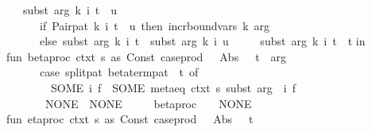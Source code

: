\begin{isabellebody}
\ \ \ \ {\isacharbar}{\kern0pt}\ subst\ arg\ k\ i\ {\isacharparenleft}{\kern0pt}t\ {\isachardollar}{\kern0pt}\ u{\isacharparenright}{\kern0pt}\ {\isacharequal}{\kern0pt}\isanewline
\ \ \ \ \ \ \ \ if\ Pair{\isacharunderscore}{\kern0pt}pat\ k\ i\ {\isacharparenleft}{\kern0pt}t\ {\isachardollar}{\kern0pt}\ u{\isacharparenright}{\kern0pt}\ then\ incr{\isacharunderscore}{\kern0pt}boundvars\ k\ arg\isanewline
\ \ \ \ \ \ \ \ else\ {\isacharparenleft}{\kern0pt}subst\ arg\ k\ i\ t\ {\isachardollar}{\kern0pt}\ subst\ arg\ k\ i\ u{\isacharparenright}{\kern0pt}\isanewline
\ \ \ \ {\isacharbar}{\kern0pt}\ subst\ arg\ k\ i\ t\ {\isacharequal}{\kern0pt}\ t{\isacharsemicolon}{\kern0pt}\isanewline
in\isanewline
\ \ fun\ beta{\isacharunderscore}{\kern0pt}proc\ ctxt\ {\isacharparenleft}{\kern0pt}s\ as\ Const\ {\isacharparenleft}{\kern0pt}\isactrlconstUNDERSCOREname {\isasymopen}case{\isacharunderscore}{\kern0pt}prod{\isasymclose}{\isacharcomma}{\kern0pt}\ {\isacharunderscore}{\kern0pt}{\isacharparenright}{\kern0pt}\ {\isachardollar}{\kern0pt}\ Abs\ {\isacharparenleft}{\kern0pt}{\isacharunderscore}{\kern0pt}{\isacharcomma}{\kern0pt}\ {\isacharunderscore}{\kern0pt}{\isacharcomma}{\kern0pt}\ t{\isacharparenright}{\kern0pt}\ {\isachardollar}{\kern0pt}\ arg{\isacharparenright}{\kern0pt}\ {\isacharequal}{\kern0pt}\isanewline
\ \ \ \ \ \ \ \ {\isacharparenleft}{\kern0pt}case\ split{\isacharunderscore}{\kern0pt}pat\ beta{\isacharunderscore}{\kern0pt}term{\isacharunderscore}{\kern0pt}pat\ {}\ t\ of\isanewline
\ \ \ \ \ \ \ \ \ \ SOME\ {\isacharparenleft}{\kern0pt}i{\isacharcomma}{\kern0pt}\ f{\isacharparenright}{\kern0pt}\ {\isacharequal}{\kern0pt}{\isachargreater}{\kern0pt}\ SOME\ {\isacharparenleft}{\kern0pt}metaeq\ ctxt\ s\ {\isacharparenleft}{\kern0pt}subst\ arg\ {}\ i\ f{\isacharparenright}{\kern0pt}{\isacharparenright}{\kern0pt}\isanewline
\ \ \ \ \ \ \ \ {\isacharbar}{\kern0pt}\ NONE\ {\isacharequal}{\kern0pt}{\isachargreater}{\kern0pt}\ NONE{\isacharparenright}{\kern0pt}\isanewline
\ \ \ \ {\isacharbar}{\kern0pt}\ beta{\isacharunderscore}{\kern0pt}proc\ {\isacharunderscore}{\kern0pt}\ {\isacharunderscore}{\kern0pt}\ {\isacharequal}{\kern0pt}\ NONE{\isacharsemicolon}{\kern0pt}\isanewline
\ \ fun\ eta{\isacharunderscore}{\kern0pt}proc\ ctxt\ {\isacharparenleft}{\kern0pt}s\ as\ Const\ {\isacharparenleft}{\kern0pt}\isactrlconstUNDERSCOREname {\isasymopen}case{\isacharunderscore}{\kern0pt}prod{\isasymclose}{\isacharcomma}{\kern0pt}\ {\isacharunderscore}{\kern0pt}{\isacharparenright}{\kern0pt}\ {\isachardollar}{\kern0pt}\ Abs\ {\isacharparenleft}{\kern0pt}{\isacharunderscore}{\kern0pt}{\isacharcomma}{\kern0pt}\ {\isacharunderscore}{\kern0pt}{\isacharcomma}{\kern0pt}\ t{\isacharparenright}{\kern0pt}{\isacharparenright}{\kern0pt}\ {\isacharequal}{\kern0pt}\isanewline

\end{isabellebody}
